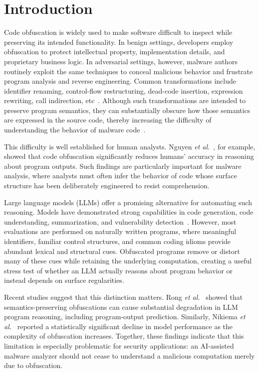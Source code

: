 \section{Introduction}

Code obfuscation is widely used to make software difficult to inspect
while preserving its intended functionality. In benign settings,
developers employ obfuscation to protect intellectual property,
implementation details, and proprietary business logic. In adversarial
settings, however, malware authors routinely exploit the same
techniques to conceal malicious behavior and frustrate program
analysis and reverse engineering. Common transformations include
identifier renaming, control-flow restructuring, dead-code insertion,
expression rewriting, call indirection, etc~\cite{collberg1997taxonomy}. Although such
transformations are intended to preserve program semantics, they can
substantially obscure how those semantics are expressed in the source
code, thereby increasing the difficulty of understanding the
behavior of malware code~\cite{collberg1997taxonomy,collberg2002manufacturing,
Obfuscation-The-Hidden-Malware,
An-Observational-Investigation-of-Reverse-Engineers-Process-and-Mental-Models}.

This difficulty is well established for human analysts. Nguyen
{\em et al.}~\cite{nguyen2026effectcodeobfuscationhuman}, for example,
showed that code obfuscation significantly reduces humans' accuracy in
reasoning about program outputs. Such findings are particularly
important for malware analysis, where analysts must often infer the
behavior of code whose surface structure has been deliberately
engineered to resist comprehension.

Large language models (LLMs) offer a promising alternative for
automating such reasoning. Models have demonstrated strong
capabilities in code generation, code understanding, summarization, and vulnerability
detection~\cite{chen2021evaluatinglargelanguagemodels,li2022codebert,
guo2021graphcodebert,roziere2023codegen,
Competition-level-code-generation-with-AlphaCode}.
However, most evaluations are performed on naturally written programs,
where meaningful identifiers, familiar control structures, and common
coding idioms provide abundant lexical and structural cues. Obfuscated
programs remove or distort many of these cues while retaining the
underlying computation, creating a useful stress test of whether an
LLM actually reasons about program behavior or instead depends on
surface regularities.

Recent studies suggest that this distinction matters.
Rong {\em et al.}~\cite{ase26} showed that semantics-preserving
obfuscations can cause substantial degradation in LLM program
reasoning, including program-output prediction. Similarly, Nikiema
{\em et al.}~\cite{nikiema2025codebarrierllmsactually} reported a
statistically significant decline in model performance as the
complexity of obfuscation increases. Together, these findings indicate
that this limitation is especially problematic
for security applications: an AI-assisted malware analyzer should not
cease to understand a malicious computation merely due to obfuscation.

